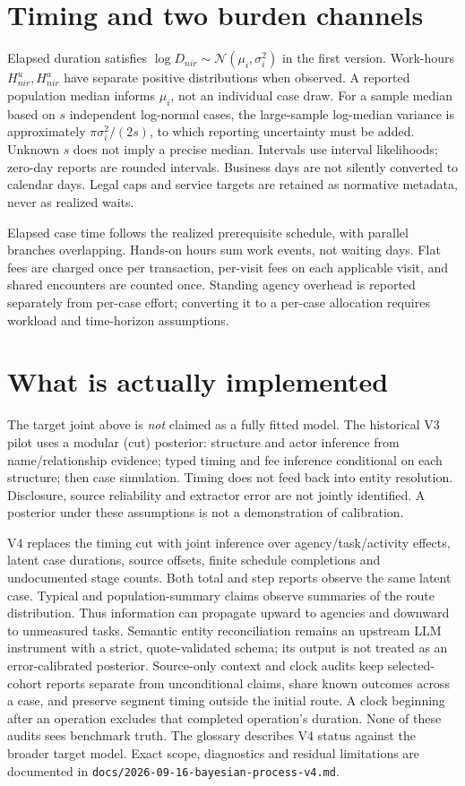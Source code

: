 \documentclass[11pt]{article}
\begin{document}
\section{Timing and two burden channels}
Elapsed duration satisfies $\log D_{nir}\sim\mathcal N(\mu_i,\sigma_i^2)$ in the
first version. Work-hours $H_{nir}^u,H_{nir}^a$ have separate positive distributions
when observed. A reported population median informs $\mu_i$, not an individual
case draw. For a sample median based on $s$ independent log-normal cases, the
large-sample log-median variance is approximately $\pi\sigma_i^2/(2s)$, to which
reporting uncertainty must be added. Unknown $s$ does not imply a precise median.
Intervals use interval likelihoods; zero-day reports are rounded intervals.
Business days are not silently converted to calendar days. Legal caps and
service targets are retained as normative metadata, never as realized waits.

Elapsed case time follows the realized prerequisite schedule, with parallel
branches overlapping. Hands-on hours sum work events, not waiting days.
Flat fees are charged once per transaction, per-visit fees on each applicable
visit, and shared encounters are counted once. Standing agency overhead is
reported separately from per-case effort; converting it to a per-case allocation
requires workload and time-horizon assumptions.

\section{What is actually implemented}
The target joint above is \emph{not} claimed as a fully fitted model.
The historical V3 pilot uses a modular (cut) posterior:
structure and actor inference from name/relationship evidence; typed timing
and fee inference conditional on each structure; then case simulation. Timing
does not feed back into entity resolution. Disclosure, source reliability and
extractor error are not jointly identified. A posterior under these assumptions
is not a demonstration of calibration.

V4 replaces the timing cut with joint inference over agency/task/activity effects,
latent case durations, source offsets, finite schedule completions and undocumented
stage counts. Both total and step reports observe the same latent case. Typical
and population-summary claims observe summaries of the route distribution. Thus
information can propagate upward to agencies and downward to unmeasured tasks.
Semantic entity reconciliation remains an upstream LLM instrument with a strict,
quote-validated schema; its output is not treated as an error-calibrated posterior.
Source-only context and clock audits keep selected-cohort reports separate from
unconditional claims, share known outcomes across a case, and preserve segment
timing outside the initial route. A clock beginning after an operation excludes
that completed operation's duration. None of these audits sees benchmark truth.
The glossary describes V4 status against the broader target model. Exact scope,
diagnostics and residual limitations are documented in
\texttt{docs/2026-09-16-bayesian-process-v4.md}.
\end{document}
